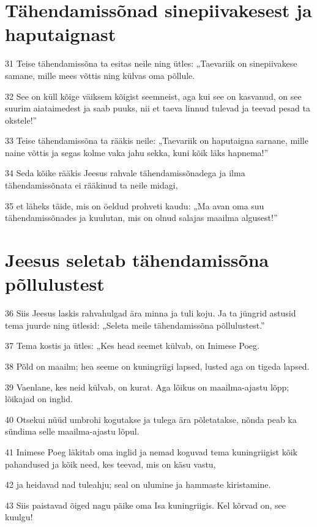 \section*{Tähendamissõnad sinepiivakesest ja haputaignast}

\par 31 Teise tähendamissõna ta esitas neile ning ütles: „Taevariik on sinepiivakese samane, mille mees võttis ning külvas oma põllule.
\par 32 See on küll kõige väiksem kõigist seemneist, aga kui see on kasvanud, on see suurim aiataimedest ja saab puuks, nii et taeva linnud tulevad ja teevad pesad ta okstele!”
\par 33 Teise tähendamissõna ta rääkis neile: „Taevariik on haputaigna sarnane, mille naine võttis ja segas kolme vaka jahu sekka, kuni kõik läks hapnema!”
\par 34 Seda kõike rääkis Jeesus rahvale tähendamissõnadega ja ilma tähendamissõnata ei rääkinud ta neile midagi,
\par 35 et läheks täide, mis on öeldud prohveti kaudu: „Ma avan oma suu tähendamissõnades ja kuulutan, mis on olnud salajas maailma algusest!”

\section*{Jeesus seletab tähendamissõna põllulustest}

\par 36 Siis Jeesus laskis rahvahulgad ära minna ja tuli koju. Ja ta jüngrid astusid tema juurde ning ütlesid: „Seleta meile tähendamissõna põllulustest.”
\par 37 Tema kostis ja ütles: „Kes head seemet külvab, on Inimese Poeg.
\par 38 Põld on maailm; hea seeme on kuningriigi lapsed, lusted aga on tigeda lapsed.
\par 39 Vaenlane, kes neid külvab, on kurat. Aga lõikus on maailma-ajastu lõpp; lõikajad on inglid.
\par 40 Otsekui nüüd umbrohi kogutakse ja tulega ära põletatakse, nõnda peab ka sündima selle maailma-ajastu lõpul.
\par 41 Inimese Poeg läkitab oma inglid ja nemad koguvad tema kuningriigist kõik pahandused ja kõik need, kes teevad, mis on käsu vastu,
\par 42 ja heidavad nad tuleahju; seal on ulumine ja hammaste kiristamine.
\par 43 Siis paistavad õiged nagu päike oma Isa kuningriigis. Kel kõrvad on, see kuulgu!

